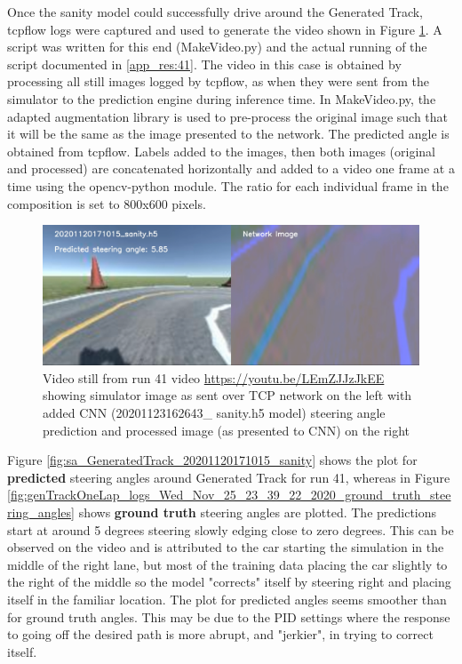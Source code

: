 Once the sanity model could successfully drive around the Generated Track, tcpflow logs were captured and used to generate the video shown in Figure \ref{fig:20201120171015_sanity_sim_network}. A script was written for this end (MakeVideo.py) and the actual running of the script documented in \ref{app_res:41}. The video in this case is obtained by processing all still images logged by tcpflow, as when they were sent from the simulator to the prediction engine during inference time. In MakeVideo.py, the adapted \cite{Naoki2016} augmentation library is used to pre-process the original image such that it will be the same as the image presented to the network. The predicted angle is obtained from tcpflow. Labels added to the images, then both images (original and processed) are concatenated horizontally and added to a video one frame at a time using the opencv-python module. The ratio for each individual frame in the composition is set to 800x600 pixels.
\begin{figure}[ht]
 \centering 
 \includegraphics[width=\textwidth]{Figures/20201120171015_sanity_sim_network.png}
 \caption{Video still from run 41 video  \url{https://youtu.be/LEmZJJzJkEE} showing simulator image as sent over TCP network on the left with added CNN (20201123162643\_ sanity.h5 model) steering angle prediction and processed image (as presented to CNN) on the right}
 \label{fig:20201120171015_sanity_sim_network} 
\end{figure}

Figure \ref{fig:sa_GeneratedTrack_20201120171015_sanity} shows the plot for \textbf{predicted} steering angles around Generated Track for run 41, whereas in Figure \ref{fig:genTrackOneLap_logs_Wed_Nov_25_23_39_22_2020_ground_truth_steering_angles} shows \textbf{ground truth} steering angles are plotted. The predictions start at around 5 degrees steering slowly edging close to zero degrees. This can be observed on the video and is attributed to the car starting the simulation in the middle of the right lane, but most of the training data placing the car slightly to the right of the middle so the model "corrects" itself by steering right and placing itself in the familiar location.
The plot for predicted angles seems smoother than for ground truth angles. This may be due to the PID settings where the response to going off the desired path is more abrupt, and "jerkier", in trying to correct itself.

